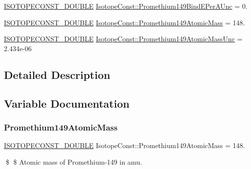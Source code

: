 \begin{DoxyCompactItemize}
\item 
\mbox{\hyperlink{group___isotope_const-_macros_ga8f45a7272ce02c0b4c65c44636ed719a}{I\+S\+O\+T\+O\+P\+E\+C\+O\+N\+S\+T\+\_\+\+D\+O\+U\+B\+LE}} \mbox{\hyperlink{group___isotope_const-_promethium-_pm149_ga9f4f084dccdd65481fa97ea716a1ac55}{Isotope\+Const\+::\+Promethium149\+Bind\+E\+Per\+A\+Unc}} = 0.
\item 
\mbox{\hyperlink{group___isotope_const-_macros_ga8f45a7272ce02c0b4c65c44636ed719a}{I\+S\+O\+T\+O\+P\+E\+C\+O\+N\+S\+T\+\_\+\+D\+O\+U\+B\+LE}} \mbox{\hyperlink{group___isotope_const-_promethium-_pm149_ga1ef87340183fcc4b088e8a47b7ba189b}{Isotope\+Const\+::\+Promethium149\+Atomic\+Mass}} = 148.
\item 
\mbox{\hyperlink{group___isotope_const-_macros_ga8f45a7272ce02c0b4c65c44636ed719a}{I\+S\+O\+T\+O\+P\+E\+C\+O\+N\+S\+T\+\_\+\+D\+O\+U\+B\+LE}} \mbox{\hyperlink{group___isotope_const-_promethium-_pm149_ga2f8e7e1adc725ec198a4951d79bc4253}{Isotope\+Const\+::\+Promethium149\+Atomic\+Mass\+Unc}} = 2.\+434e-\/06
\end{DoxyCompactItemize}


\subsection{Detailed Description}


\subsection{Variable Documentation}
\mbox{\label{group___isotope_const-_promethium-_pm149_ga1ef87340183fcc4b088e8a47b7ba189b}} 
\subsubsection{\texorpdfstring{Promethium149\+Atomic\+Mass}{Promethium149AtomicMass}}
{\footnotesize\ttfamily \mbox{\hyperlink{group___isotope_const-_macros_ga8f45a7272ce02c0b4c65c44636ed719a}{I\+S\+O\+T\+O\+P\+E\+C\+O\+N\+S\+T\+\_\+\+D\+O\+U\+B\+LE}} Isotope\+Const\+::\+Promethium149\+Atomic\+Mass = 148.}

\$ \$ Atomic mass of Promethium-\/149 in amu. \mbox{\label{group___isotope_const-_promethium-_pm149_ga2f8e7e1adc725ec198a4951d79bc4253}} 

